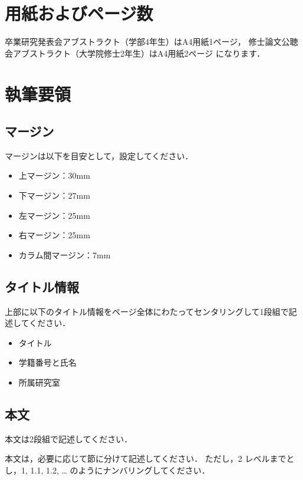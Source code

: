 \documentclass[a4paper,uplatex]{ujarticle}
\begin{document}
\small

\twocolumn[\vspace*{29mm}] %
\begin{論文概要}           %

\section{用紙およびページ数}
卒業研究発表会アブストラクト（学部4年生）はA4用紙1ページ，
修士論文公聴会アブストラクト（大学院修士2年生）はA4用紙2ページ
になります．

\section{執筆要領}

\subsection{マージン}
マージンは以下を目安として，設定してください．

\begin{itemize}
\item 上マージン：30mm
\item 下マージン：27mm
\item 左マージン：25mm
\item 右マージン：25mm
\item カラム間マージン：7mm
\end{itemize}

\subsection{タイトル情報}
上部に以下のタイトル情報をページ全体にわたってセンタリングして1段組で記述してください．

\begin{itemize}
\item タイトル
\item 学籍番号と氏名
\item 所属研究室
\end{itemize}

\subsection{本文}
本文は2段組で記述してください．

本文は，必要に応じて節に分けて記述してください．
ただし，2 レベルまでとし，1, 1.1, 1.2, … のようにナンバリングしてください．


\end{論文概要}
\end{document}
